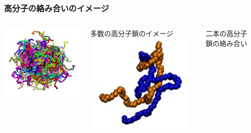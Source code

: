 \documentclass[12pt, dvipdfmx]{beamer}
\begin{document}
\begin{frame}
	\frametitle{高分子の絡み合いのイメージ}
	\begin{columns}[c, onlytextwidth]
		\centering
		\includegraphics[width=\textwidth]{polymer_image2.png}

		多数の高分子鎖のイメージ
		\centering
		\includegraphics[width=\textwidth]{karamiai.png}

		二本の高分子鎖の絡み合い
	\end{columns}
\end{frame}
\end{document}
